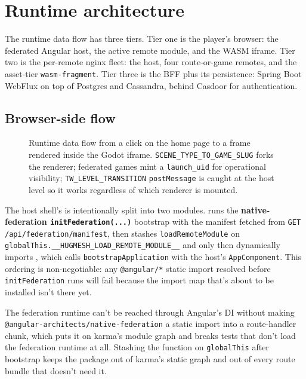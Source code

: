 \chapter{Runtime architecture}

The runtime data flow has three tiers. Tier one is the player's browser:
the federated Angular host, the active remote module, and the WASM iframe.
Tier two is the per-remote nginx fleet: the host, four route-or-game
remotes, and the asset-tier \texttt{wasm-fragment}. Tier three is the BFF
plus its persistence: Spring Boot WebFlux on top of Postgres and Cassandra,
behind Casdoor for authentication.

\section{Browser-side flow}

\begin{figure}[!h]
\centering
{}
\caption{Runtime data flow from a click on the home page to a frame
rendered inside the Godot iframe. \texttt{SCENE\_TYPE\_TO\_GAME\_SLUG}
forks the renderer; federated games mint a \texttt{launch\_uid} for
operational visibility; \texttt{TW\_LEVEL\_TRANSITION} \texttt{postMessage}
is caught at the host level so it works regardless of which renderer is
mounted.}
\end{figure}

The host shell's  is intentionally split into two
modules.  runs the
\textbf{native-federation \texttt{initFederation(...)}} bootstrap with the
manifest fetched from \texttt{GET /api/federation/manifest}, then stashes
\texttt{loadRemoteModule} on \texttt{globalThis.\_\_HUGMESH\_LOAD\_REMOTE\_MODULE\_\_}
and only then dynamically imports , which calls
\texttt{bootstrapApplication} with the host's \texttt{AppComponent}. This
ordering is non-negotiable: any \texttt{@angular/*} static import resolved
before \texttt{initFederation} runs will fail because the import map
that's about to be installed isn't there yet.

\begin{snapnote}[title={Why \texttt{globalThis} and not a service?}]
The federation runtime can't be reached through Angular's DI without
making \texttt{@angular-architects/native-federation} a static import
into a route-handler chunk, which puts it on karma's module graph and
breaks tests that don't load the federation runtime at all. Stashing the
function on \texttt{globalThis} after bootstrap keeps the package out of
karma's static graph and out of every route bundle that doesn't need it.
\end{snapnote}

